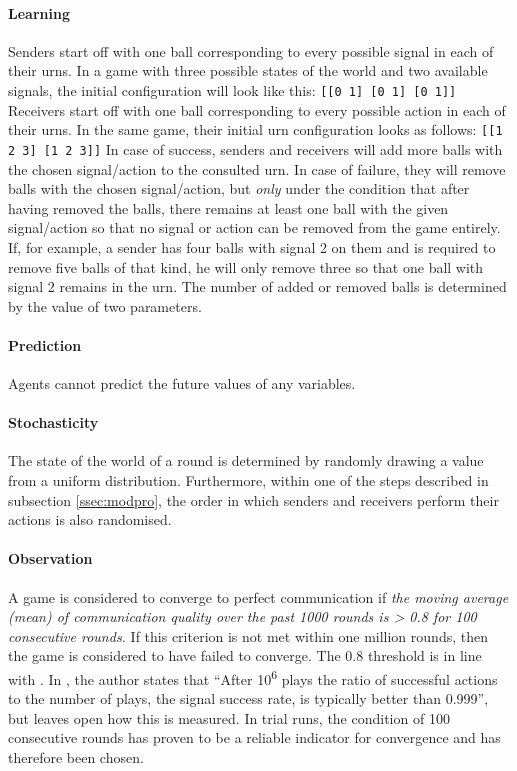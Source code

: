 \documentclass[
	DIV=calc,
	BCOR=0mm,
	pagesize,
]{scrartcl}
\newcommand{\code}[1]{\texttt{#1}}
\begin{document}
\paragraph{Learning}
Senders start off with one ball corresponding to every possible signal in each of their urns.
In a game with three possible states of the world and two available signals, the initial configuration will look like this: \code{[[0 1] [0 1] [0 1]]}
Receivers start off with one ball corresponding to every possible action in each of their urns.
In the same game, their initial urn configuration looks as follows: \code{[[1 2 3] [1 2 3]]}
In case of success, senders and receivers will add more balls with the chosen signal/action to the consulted urn.
In case of failure, they will remove balls with the chosen signal/action, but \emph{only} under the condition that after having removed the balls, there remains at least one ball with the given signal/action so that no signal or action can be removed from the game entirely.
If, for example, a sender has four balls with signal 2 on them and is required to remove five balls of that kind, he will only remove three so that one ball with signal 2 remains in the urn.
The number of added or removed balls is determined by the value of two parameters.

\paragraph{Prediction}
Agents cannot predict the future values of any variables.

\paragraph{Stochasticity}
The state of the world of a round is determined by randomly drawing a value from a uniform distribution.
Furthermore, within one of the steps described in subsection \ref{ssec:modpro}, the order in which senders and receivers perform their actions is also randomised.

\paragraph{Observation}
A game is considered to converge to perfect communication if \emph{the moving average (mean) of communication quality over the past 1000 rounds is > 0.8 for 100 consecutive rounds.}
If this criterion is not met within one million rounds, then the game is considered to have failed to converge.
The 0.8 threshold is in line with \citet[p.~533]{barrett_numerical_2006, barrett_dynamic_2007}.
In \citet[sec.~2, unpaginated preprint]{barrett_numerical_2006}, the author states that ``After 10\textsuperscript{6} plays the ratio of successful actions to the number of plays, the signal success rate, is typically better than 0.999'', but leaves open how this is measured.
In trial runs, the condition of 100 consecutive rounds has proven to be a reliable indicator for convergence and has therefore been chosen.
\end{document}
